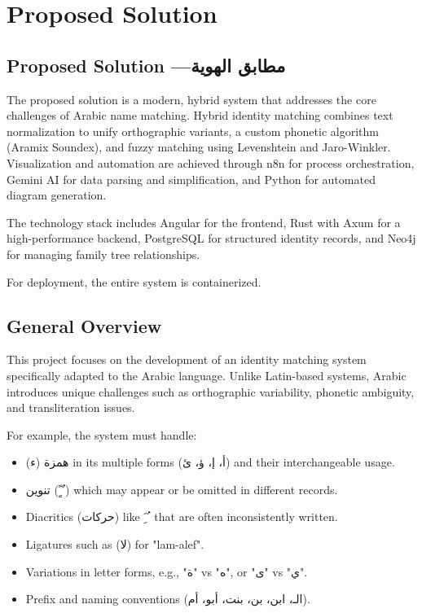 \section{Proposed Solution}

\subsection{Proposed Solution ---مطابق الهوية}
The proposed solution is a modern, hybrid system that addresses the core challenges of Arabic name matching.
Hybrid identity matching combines text normalization to unify orthographic variants, a custom phonetic algorithm (Aramix Soundex), and fuzzy matching using Levenshtein and Jaro-Winkler.
Visualization and automation are achieved through n8n for process orchestration, Gemini AI for data parsing and simplification, and Python for automated diagram generation.

The technology stack includes Angular for the frontend, Rust with Axum for a high-performance backend, PostgreSQL for structured identity records, and Neo4j for managing family tree relationships.

For deployment, the entire system is containerized.

\subsection{General Overview}
This project focuses on the development of an identity matching system specifically
adapted to the Arabic language. Unlike Latin-based systems, Arabic introduces unique challenges such as orthographic variability, phonetic ambiguity, and transliteration issues.

For example, the system must handle:
\begin{itemize}
    \item \textarabic{همزة} (ء) in its multiple forms (\textarabic{أ، إ، ؤ، ئ}) and their interchangeable usage.
    \item \textarabic{تنوين} (\textarabic{ً ٍ ٌ}) which may appear or be omitted in different records.
    \item Diacritics (\textarabic{حركات}) like \textarabic{َ ِ ُ} that are often inconsistently written.
    \item Ligatures such as (\textarabic{ﻻ}) for "lam-alef".
    \item Variations in letter forms, e.g., "\textarabic{ة}" vs "\textarabic{ه}", or "\textarabic{ى}" vs "\textarabic{ي}".
    \item Prefix and naming conventions (\textarabic{الـ، ابن، بن، بنت، أبو، أم}).
\end{itemize}

